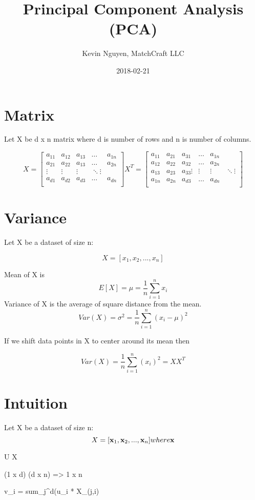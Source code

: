\documentclass{article}
\title{Principal Component Analysis (PCA)}
\date{2018-02-21}
\author{Kevin Nguyen, MatchCraft LLC}
\begin{document}
\maketitle

\section{Matrix}

Let X be d x n matrix where d is number of rows and n is number of columns.

$$
X = 
\begin{bmatrix}
  a_{11} & a_{12} & a_{13} & \dots & a_{1n} \\
  a_{21} & a_{22} & a_{13} & \dots & a_{2n} \\
  \vdots & \vdots & \vdots & \ddots \vdots \\
  a_{d1} & a_{d2} & a_{d3} & \dots & a_{dn} \\  
\end{bmatrix}
X^T =
\begin{bmatrix}
  a_{11} & a_{21} & a_{31} & \dots & a_{1n} \\
  a_{12} & a_{22} & a_{32} & \dots & a_{2n} \\
  a_{13} & a_{23} & a_{33}
  \vdots & \vdots & \vdots & \ddots \vdots \\
  a_{1n} & a_{2n} & a_{d3} & \dots & a_{dn} \\  
\end{bmatrix}
$$

\section{Variance}
Let X be a dataset of size n:

$$X = [x_1, x_2, ..., x_n]$$

Mean of X is
$$E[X] = \mu = \frac{1}{n}\sum_{i=1}^{n}x_i$$
Variance of X is the average of square distance from the mean.
$$Var(X) = \sigma^2 = \frac{1}{n}\sum_{i=1}^{n} (x_i - \mu)^2$$

If we shift data points in X to center around its mean then

$$Var(X) = \frac{1}{n}\sum_{i=1}^{n}(x_i)^2 = XX^T$$

\section{Intuition}
Let X be a dataset of size n:
$$ X = [\bold{x}_1, \bold{x}_2, ..., \bold{x}_n] where \bold{x}  $$








U X

(1 x d) (d x n) => 1 x n

v_i = sum_{j}^{d}(u_i * X_(j,i)
\end{document}
